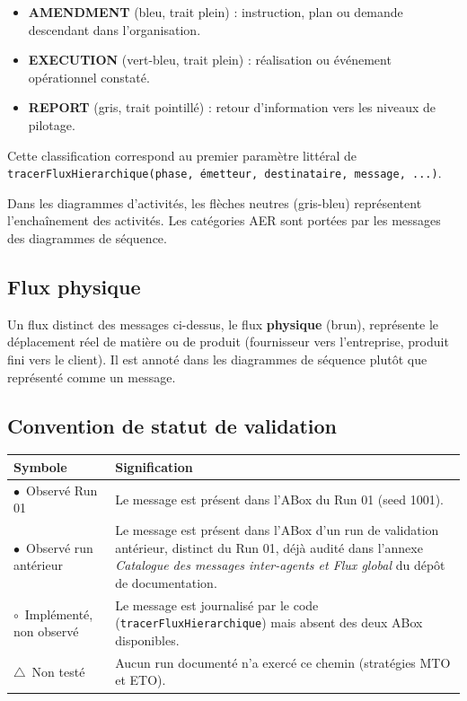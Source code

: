 \documentclass[11pt,a4paper]{article}
\newcommand{\code}[1]{\texttt{#1}}
\newcommand{\stRUN}{\ensuremath{\bullet}~Observé Run 01}
\newcommand{\stANT}{\ensuremath{\bullet}~Observé run antérieur}
\newcommand{\stIMP}{\ensuremath{\circ}~Implémenté, non observé}
\newcommand{\stNT}{\ensuremath{\triangle}~Non testé}
\begin{document}
\begin{itemize}
  \item \textbf{AMENDMENT} (\textcolor{colAmend}{bleu, trait plein}) : instruction, plan ou demande descendant dans l'organisation.
  \item \textbf{EXECUTION} (\textcolor{colExec}{vert-bleu, trait plein}) : réalisation ou événement opérationnel constaté.
  \item \textbf{REPORT} (\textcolor{colReport}{gris, trait pointillé}) : retour d'information vers les niveaux de pilotage.
\end{itemize}

Cette classification correspond au premier paramètre littéral de \code{tracerFluxHierarchique(phase, émetteur, destinataire, message, ...)}.

Dans les diagrammes d'activités, les flèches neutres (\textcolor{colFlow}{gris-bleu}) représentent l'enchaînement des activités. Les catégories AER sont portées par les messages des diagrammes de séquence.

\subsection{Flux physique}

Un flux distinct des messages ci-dessus, le flux \textbf{physique} (\textcolor{colPhys}{brun}), représente le déplacement réel de matière ou de produit (fournisseur vers l'entreprise, produit fini vers le client). Il est annoté dans les diagrammes de séquence plutôt que représenté comme un message.

\subsection{Convention de statut de validation}

\begin{center}
\begin{tabularx}{\textwidth}{lX}
\toprule
Symbole & Signification \\
\midrule
\stRUN & Le message est présent dans l'ABox du Run 01 (seed 1001). \\
\stANT & Le message est présent dans l'ABox d'un run de validation antérieur, distinct du Run 01, déjà audité dans l'annexe \emph{Catalogue des messages inter-agents et Flux global} du dépôt de documentation. \\
\stIMP & Le message est journalisé par le code (\code{tracerFluxHierarchique}) mais absent des deux ABox disponibles. \\
\stNT & Aucun run documenté n'a exercé ce chemin (stratégies MTO et ETO). \\
\bottomrule
\end{tabularx}
\end{center}
\end{document}
